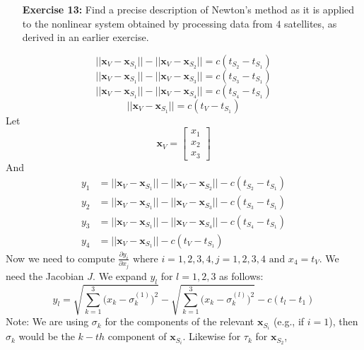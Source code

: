\documentclass[11pt]{article}
\theoremstyle{definition}
\newcommand{\1}[1]{\mathbf{1} \left \{ #1 \right \}}
\begin{document}
\begin{itemize}
\item[{\textbf{Exercise 13:}}] Find a precise description of Newton's method as it is applied to the nonlinear system obtained by processing data from $4$ satellites, as derived in an earlier exercise.
\end{itemize}
\setcounter{equation}{0}
\begin{equation}
    ||\textbf{x}_V - \textbf{x}_{S_1}|| - ||\textbf{x}_V - \textbf{x}_{S_2}|| = c(t_{S_2} - t_{S_1})
\end{equation}
\begin{equation}
    ||\textbf{x}_V - \textbf{x}_{S_1}|| - ||\textbf{x}_V - \textbf{x}_{S_3}|| = c(t_{S_3} - t_{S_1})
\end{equation}
\begin{equation}
    ||\textbf{x}_V - \textbf{x}_{S_1}|| - ||\textbf{x}_V - \textbf{x}_{S_4}|| = c(t_{S_4} - t_{S_1})
\end{equation}
\begin{equation}
    ||\textbf{x}_V - \textbf{x}_{S_1}|| = c(t_V - t_{S_1})
\end{equation}
Let \[\textbf{x}_V = \begin{bmatrix}
x_1 \\ x_2 \\ x_3 \end{bmatrix}\]
And
\begin{align*}
    y_1 &= ||\textbf{x}_V - \textbf{x}_{S_1}|| - ||\textbf{x}_V - \textbf{x}_{S_2}|| - c(t_{S_2} - t_{S_1}) \\
    y_2 &= ||\textbf{x}_V - \textbf{x}_{S_1}|| - ||\textbf{x}_V - \textbf{x}_{S_3}|| - c(t_{S_3} - t_{S_1}) \\
    y_3 &= ||\textbf{x}_V - \textbf{x}_{S_1}|| - ||\textbf{x}_V - \textbf{x}_{S_4}|| - c(t_{S_4} - t_{S_1}) \\
    y_4 &= ||\textbf{x}_V - \textbf{x}_{S_1}|| - c(t_V - t_{S_1})
\end{align*}
Now we need to compute \(\frac{\partial y_i}{\partial x_j} \text{ where } i = 1, 2, 3, 4,  j = 1, 2, 3, 4 \text{ and } x_4 = t_V\).  We need the Jacobian $J$.  We expand $y_l$ for $l = 1, 2, 3$ as follows:
\begin{equation*}
    y_l = \sqrt{\sum_{k=1}^3 \big(x_k - \sigma_k^{(1)}\big)^2} - \sqrt{\sum_{k=1}^3 \big(x_k - \sigma_k^{(l)}\big)^2} - c(t_l - t_1)
\end{equation*}
Note: We are using $\sigma_k$ for the components of the relevant $\textbf{x}_{S_i}$ (e.g., if $i = 1$), then $\sigma_k$ would be the $k-th$ component of $\textbf{x}_{S_i}$.  Likewise for $\tau_k$ for $\textbf{x}_{S_2}$,
\end{document}
